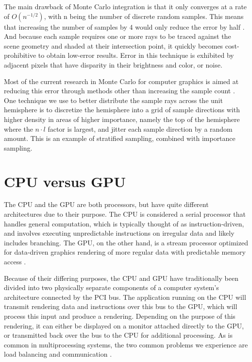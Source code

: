 The main drawback of Monte Carlo integration is that it only converges at a rate of $O(n^{-1/2})$, with n being the number of discrete random samples. This means that increasing the number of samples by 4 would only reduce the error by half \cite{bib:pbr}. And because each sample requires one or more rays to be traced against the scene geometry and shaded at their intersection point, it quickly becomes cost-prohibitive to obtain low-error results. Error in this technique is exhibited by adjacent pixels that have disparity in their brightness and color, or noise.

Most of the current research in Monte Carlo for computer graphics is aimed at reducing this error through methods other than increasing the sample count \cite{bib:pbr}. One technique we use to better distribute the sample rays across the unit hemisphere is to discretize the hemisphere into a grid of sample directions with higher density in areas of higher importance, namely the top of the hemisphere where the $n \cdot l$ factor is largest, and jitter each sample direction by a random amount. This is an example of stratified sampling, combined with importance sampling.

\section{CPU versus GPU}
\label{sec:cpu_v_gpu}

The CPU and the GPU are both processors, but have quite different architectures due to their purpose. The CPU is considered a serial processor that handles general computation, which is typically thought of as instruction-driven, and involves executing unpredictable instructions on irregular data and likely includes branching. The GPU, on the other hand, is a stream processor optimized for data-driven graphics rendering of more regular data with predictable memory access \cite{bib:rtr}.

Because of their differing purposes, the CPU and GPU have traditionally been divided into two physically separate components of a computer system's architecture connected by the PCI bus. The application running on the CPU will transmit rendering data and instructions over this bus to the GPU, which will process this input and produce a rendering. Depending on the purpose of this rendering, it can either be displayed on a monitor attached directly to the GPU, or transmitted back over the bus to the CPU for additional processing. As is common in multiprocessing systems, the two common problems we experience are load balancing and communication \cite{bib:rtr}. 

